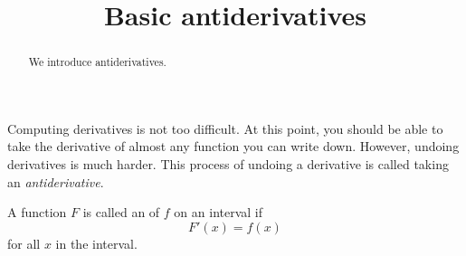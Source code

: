 \documentclass{ximera}
\title[Dig-In:]{Basic antiderivatives}
\begin{document}
\begin{abstract}
  We introduce antiderivatives.
\end{abstract}
\maketitle


Computing derivatives is not too difficult. At this point, you should be able to take the derivative of almost any function you can write
down. However, undoing derivatives is much harder. This process of undoing a derivative is called taking an \textit{antiderivative}.

\begin{definition}
	A function $F$ is called an  of $f$ on an interval if
	\[ F'(x) = f(x) \]
	for all $x$ in the interval.
\end{definition}
\end{document}
